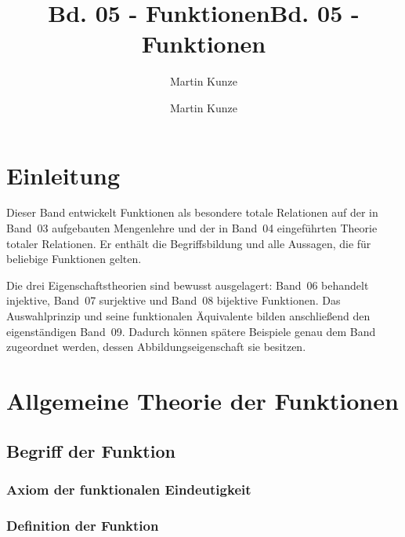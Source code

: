 \documentclass[main.tex]{subfiles}
\title{Bd. 05 - Funktionen}
\author{Martin Kunze}
\date{}
\begin{document}
\title{Bd. 05 - Funktionen}
\author{Martin Kunze}
\date{}
\hypersetup{pageanchor=false}
\maketitle
\hypersetup{pageanchor=true}
\setcounter{tocdepth}{3}
\tableofcontents
\setcounter{file}{5}
\renewcommand{\FormulaBandID}{5}

\chapter{Einleitung}

Dieser Band entwickelt Funktionen als besondere totale Relationen auf der in
Band~03 aufgebauten Mengenlehre und der in Band~04 eingeführten Theorie
totaler Relationen. Er enthält die Begriffsbildung und alle Aussagen, die für
beliebige Funktionen gelten.

Die drei Eigenschaftstheorien sind bewusst ausgelagert: Band~06 behandelt
injektive, Band~07 surjektive und Band~08 bijektive Funktionen. Das
Auswahlprinzip und seine funktionalen Äquivalente bilden anschließend den
eigenständigen Band~09. Dadurch können spätere Beispiele genau dem Band
zugeordnet werden, dessen Abbildungseigenschaft sie besitzen.

\chapter{Allgemeine Theorie der Funktionen}

\section{Begriff der Funktion}

\subsection{Axiom der funktionalen Eindeutigkeit}

{
}

\subsection{Definition der Funktion}


\end{document}
